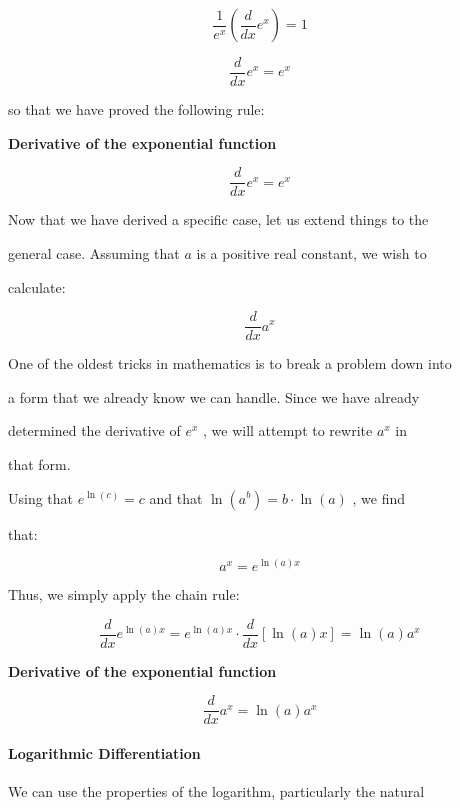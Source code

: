 $$\frac{1}{e^x}\left(\frac{d}{dx}e^x\right)=1$$



$$\frac{d}{dx}e^x=e^x$$



so that we have proved the following rule:



\textbf{Derivative of the exponential function}

 $$\frac{d}{dx}e^x=e^x$$               



Now that we have derived a specific case, let us extend things to the

general case. Assuming that $a$ is a positive real constant, we wish to

calculate:



$$\frac{d}{dx}a^x$$



One of the oldest tricks in mathematics is to break a problem down into

a form that we already know we can handle. Since we have already

determined the derivative of $e^x$ , we will attempt to rewrite $a^x$ in

that form.



Using that $e^{\ln(c)}=c$ and that $\ln(a^b)=b\cdot\ln(a)$ , we find

that:



$$a^x=e^{\ln(a)x}$$



Thus, we simply apply the chain rule:



$$\frac{d}{dx}e^{\ln(a)x}=e^{\ln(a)x}\cdot\frac{d}{dx}[\ln(a)x]=\ln(a)a^x$$



 \textbf{Derivative of the exponential function}

 $$\frac{d}{dx}a^x=\ln(a)a^x$$                





\paragraph{Logarithmic Differentiation}



We can use the properties of the logarithm, particularly the natural

